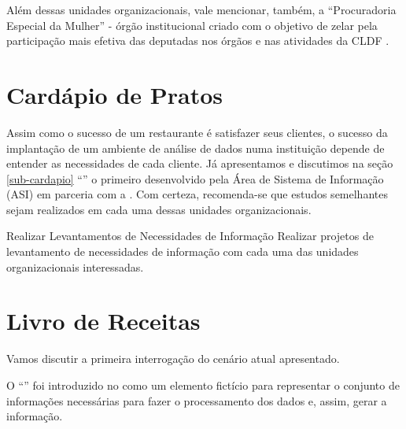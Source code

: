    Além dessas unidades organizacionais, vale mencionar, também, a ``Procuradoria Especial da Mulher'' - órgão institucional criado com o objetivo de zelar pela participação mais efetiva das deputadas nos órgãos e nas atividades da CLDF \cite{site:cldf:mulher}.

    
    \section{Cardápio de Pratos}
    
    \begin{env-cenario2}{}
        \mschecksim \xspace \CARDAPIO
    \end{env-cenario2}  
    
    Assim como o sucesso de um restaurante é satisfazer seus clientes, o sucesso da implantação de um ambiente de análise de dados numa instituição depende de entender as necessidades de cada cliente. 
    Já apresentamos e discutimos na seção \ref{sub-cardapio} ``'' o primeiro \CARDAPIO \xspace desenvolvido pela Área de Sistema de Informação (ASI) em parceria com a \CDDHCEDP.
    Com certeza, recomenda-se que estudos semelhantes sejam realizados em cada uma dessas unidades organizacionais. 

    \begin{env-proposta}{Realizar Levantamentos de Necessidades de Informação}
        \nohyphens{Realizar projetos de levantamento de necessidades de informação com cada uma das unidades organizacionais interessadas.}
    \end{env-proposta}
    
    \section{Livro de Receitas}
    \label{sec-acoes-livrodereceitas}

    Vamos discutir a primeira interrogação \mscheckint \xspace do cenário atual apresentado.

    \begin{env-cenario2}{}
        \mscheckint \xspace \LIVRODERECEITAS
    \end{env-cenario2}  

    O ``'' foi introduzido no  como um elemento fictício para representar o conjunto de informações necessárias para fazer o processamento dos dados e, assim, gerar a informação. 
    
